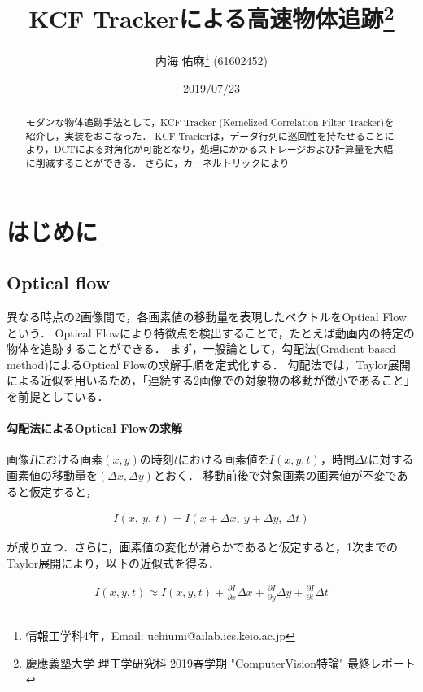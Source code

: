 \documentclass[11pt,a4j]{jarticle}
\title{{KCF Trackerによる高速物体追跡}\thanks{慶應義塾大学 理工学研究科 2019春学期 "ComputerVision特論" 最終レポート} \\ }
\author{内海 佑麻\thanks{情報工学科4年，Email: uchiumi@ailab.ics.keio.ac.jp} (61602452)}
\date{2019/07/23}
\begin{document}
  \maketitle
  \begin{abstract}
    モダンな物体追跡手法として，KCF Tracker (Kernelized Correlation Filter Tracker)を紹介し，実装をおこなった．
    KCF Trackerは，データ行列に巡回性を持たせることにより，DCTによる対角化が可能となり，処理にかかるストレージおよび計算量を大幅に削減することができる．
    さらに，カーネルトリックにより
  \end{abstract}
  \tableofcontents
  \section{はじめに}

    \subsection{Optical flow}
      異なる時点の2画像間で，各画素値の移動量を表現したベクトルをOptical Flowという．
      Optical Flowにより特徴点を検出することで，たとえば動画内の特定の物体を追跡することができる．
      まず，一般論として，勾配法(Gradient-based method)によるOptical Flowの求解手順を定式化する．
      勾配法では，Taylor展開による近似を用いるため，「連続する2画像での対象物の移動が微小であること」を前提としている．

      \paragraph{勾配法によるOptical Flowの求解}
      画像$I$における画素$(x,y)$の時刻$t$における画素値を$I(x,y,t)$，時間$\Delta t$に対する画素値の移動量を$(\Delta x, \Delta y)$とおく．
      移動前後で対象画素の画素値が不変であると仮定すると，

      \begin{align}
        I(x, ~ y, ~ t) = I(x + \Delta x, ~ y + \Delta y, ~ \Delta t)
      \end{align}

      が成り立つ．さらに，画素値の変化が滑らかであると仮定すると，1次までのTaylor展開により，以下の近似式を得る．

      \begin{align}
        I(x,y,t) \approx I(x,y,t) + \frac{\partial I}{\partial x} \Delta x + \frac{\partial I}{\partial y} \Delta y + \frac{\partial I}{\partial t} \Delta t
      \end{align}
\end{document}
